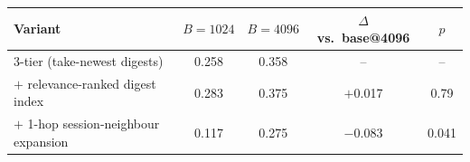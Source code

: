 \begin{tabular}{lcccc}
\toprule
Variant & $B{=}1024$ & $B{=}4096$ & $\Delta$ vs.\ base@4096 & $p$ \\
\midrule
3-tier (take-newest digests) & 0.258 & 0.358 & -- & -- \\
$+$ relevance-ranked digest index & 0.283 & 0.375 & $+$0.017 & 0.79 \\
$+$ 1-hop session-neighbour expansion & 0.117 & 0.275 & $-$0.083 & 0.041 \\
\bottomrule
\end{tabular}
